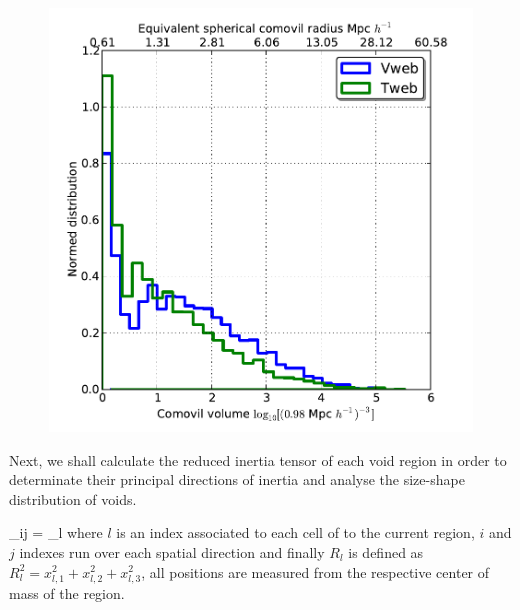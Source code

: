 \documentclass[a4,useAMS,usenatbib,usegraphicx]{latex/mn2e}
\begin{document}
\begin{flushleft}
\begin{figure}
\begin{center}
  \includegraphics[trim = 0mm 00mm 00mm 00mm, clip, keepaspectratio=true,
  width=0.36\textheight]{./figures/voids_regions_volume.pdf}


  \label{fig:percolation_analysis}
  \vspace{0.1 cm}

\end{center}
\end{figure}
\end{flushleft}



Next, we shall calculate the reduced inertia tensor of each void region 
in order to determinate their principal directions of inertia and analyse 
the size-shape distribution of voids.


{ \tau_{ij} = \sum_l  }
where $l$ is an index associated to each cell of to the current region, 
$i$ and $j$ indexes run over each spatial direction and finally 
$R_l$ is defined as $R_l^2 = x_{l,1}^2 + x_{l,2}^2 + x_{l,3}^2$, all 
positions are measured from the respective center of mass of the region.
\end{document}
